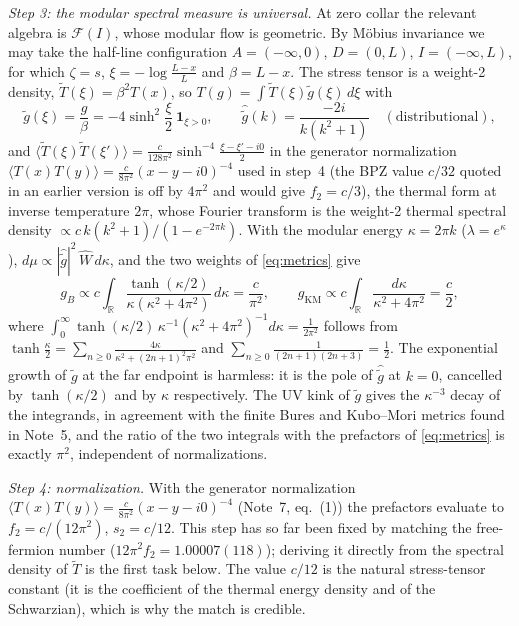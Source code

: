 \documentclass[11pt]{article}
\theoremstyle{accent}
\theoremstyle{definition}
\newcommand{\cF}{\mathcal{F}}
\begin{document}
\emph{Step 3: the modular spectral measure is universal.}
At zero collar the relevant algebra is \(\cF(I)\), whose modular flow is geometric.  By M\"obius invariance we may take the half-line configuration \(A=(-\infty,0)\), \(D=(0,L)\), \(I=(-\infty,L)\), for which \(\zeta=s\), \(\xi=-\log\frac{L-x}{L}\) and \(\beta=L-x\).  The stress tensor is a weight-2 density, \(\widetilde T(\xi)=\beta^2T(x)\), so \(T(g)=\int\widetilde T(\xi)\widetilde g(\xi)\,d\xi\) with
\begin{equation}\label{eq:gtilde}
 \widetilde g(\xi)=\frac{g}{\beta}=-4\sinh^2\frac\xi2\ \mathbf 1_{\xi>0},\qquad
 \widehat{\widetilde g}(k)=\frac{-2i}{k(k^2+1)}\quad(\text{distributional}),
\end{equation}
and \(\langle\widetilde T(\xi)\widetilde T(\xi')\rangle=\frac{c}{128\pi^2}\sinh^{-4}\frac{\xi-\xi'-i0}{2}\) in the generator normalization \(\langle T(x)T(y)\rangle=\frac{c}{8\pi^2}(x-y-i0)^{-4}\) used in step~4 (the BPZ value \(c/32\) quoted in an earlier version is off by \(4\pi^2\) and would give \(f_2=c/3\)), the thermal form at inverse temperature \(2\pi\), whose Fourier transform is the weight-2 thermal spectral density \(\propto c\,k(k^2+1)/(1-e^{-2\pi k})\).  With the modular energy \(\kappa=2\pi k\) (\(\lambda=e^{\kappa}\)), \(d\mu\propto|\widehat{\widetilde g}|^2\,\widehat W\,d\kappa\), and the two weights of \eqref{eq:metrics} give
\begin{equation}\label{eq:integrals}
 g_B\propto c\int_{\mathbb R}\frac{\tanh(\kappa/2)}{\kappa(\kappa^2+4\pi^2)}\,d\kappa=\frac{c}{\pi^2},\qquad
 g_{\mathrm{KM}}\propto c\int_{\mathbb R}\frac{d\kappa}{\kappa^2+4\pi^2}=\frac c2,
\end{equation}
where \(\int_0^\infty\tanh(\kappa/2)\,\kappa^{-1}(\kappa^2+4\pi^2)^{-1}d\kappa=\frac1{2\pi^2}\) follows from \(\tanh\frac\kappa2=\sum_{n\ge0}\frac{4\kappa}{\kappa^2+(2n+1)^2\pi^2}\) and \(\sum_{n\ge0}\frac1{(2n+1)(2n+3)}=\frac12\).  The exponential growth of \(\widetilde g\) at the far endpoint is harmless: it is the pole of \(\widehat{\widetilde g}\) at \(k=0\), cancelled by \(\tanh(\kappa/2)\) and by \(\kappa\) respectively.  The UV kink of \(\widetilde g\) gives the \(\kappa^{-3}\) decay of the integrands, in agreement with the finite Bures and Kubo--Mori metrics found in Note~5, and the ratio of the two integrals with the prefactors of \eqref{eq:metrics} is exactly \(\pi^2\), independent of normalizations.

\emph{Step 4: normalization.}
With the generator normalization \(\langle T(x)T(y)\rangle=\frac{c}{8\pi^2}(x-y-i0)^{-4}\) (Note~7, eq.~(1)) the prefactors evaluate to \(f_2=c/(12\pi^2)\), \(s_2=c/12\).  This step has so far been fixed by matching the free-fermion number (\(12\pi^2f_2=1.00007(118)\)); deriving it directly from the spectral density of \(\widetilde T\) is the first task below.  The value \(c/12\) is the natural stress-tensor constant (it is the coefficient of the thermal energy density and of the Schwarzian), which is why the match is credible.
\end{document}

